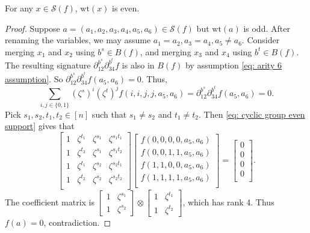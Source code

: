 \begin{lemma}\label{lm: cyclic group even support}
    For any $x\in\mathscr{S}(f)$, $\mathrm{wt}(x)$ is even.
\end{lemma}
\begin{proof}
    Suppose $a=(a_1,a_2,a_3,a_4,a_5,a_6)\in \mathscr{S}(f)$ but $\mathrm{wt}(a)$ is odd.
    After renaming the variables, we may assume $a_1=a_2,a_3=a_4,a_5\neq a_6.$
    Consider merging $x_1$ and $x_2$ using $b^s\in B(f)$, and merging $x_3$ and $x_4$ using $b^t\in B(f)$.
    The resulting signature $\partial_{12}^{b^s}\partial^{b^t}_{34}f$ is also in $B(f)$ by assumption \eqref{eq: arity 6 assumption}.
    So $\partial_{12}^{b^s}\partial^{b^t}_{34}f(a_5,a_6)=0.$
    Thus,
    \begin{equation}\label{eq: cyclic group even support}
        \sum_{i,j\in\{0,1\}}(\zeta^s)^i(\zeta^t)^jf(i,i,j,j,a_5,a_6)=\partial_{12}^{b^s}\partial^{b^t}_{34}f(a_5,a_6)=0.
    \end{equation}
    Pick $s_1,s_2,t_1,t_2\in [n]$ such that $s_1\neq s_2$ and $t_1\neq t_2.$
    Then \eqref{eq: cyclic group even support} gives that 
    \begin{equation*}
        \left[\begin{matrix}
            1 & \zeta^{t_1} & \zeta^{s_1} & \zeta^{s_1t_1}\\
            1 & \zeta^{t_2} & \zeta^{s_1} & \zeta^{s_1t_2}\\
            1 & \zeta^{t_1} & \zeta^{s_2} & \zeta^{s_2t_1}\\
            1 & \zeta^{t_2} & \zeta^{s_2} & \zeta^{s_2t_2}\\
        \end{matrix}\right]
        \left[\begin{matrix}
            f(0,0,0,0,a_5,a_6)\\
            f(0,0,1,1,a_5,a_6)\\
            f(1,1,0,0,a_5,a_6)\\
            f(1,1,1,1,a_5,a_6)\\
        \end{matrix}\right]
        =\left[\begin{matrix}
            0\\
            0\\
            0\\
            0\\
        \end{matrix}\right].
    \end{equation*}
    The coefficient matrix is 
    $\left[\begin{smallmatrix}
        1 & \zeta^{s_1}\\
        1 & \zeta^{s_2}
    \end{smallmatrix}\right]\otimes\left[\begin{smallmatrix}
        1 & \zeta^{t_1}\\
        1 & \zeta^{t_2}
    \end{smallmatrix}\right]$, which has rank 4.
    Thus $f(a)=0$, contradiction.
\end{proof}

